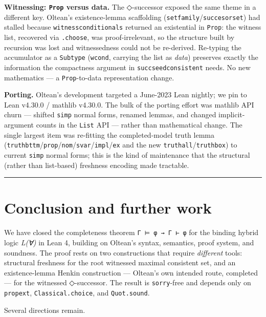 \documentclass[11pt,a4paper]{article}
\renewcommand{\_}{\origtextunderscore\allowbreak}
\begin{document}
\textbf{Witnessing: \texttt{Prop} versus data.} The ◇-successor exposed the same theme in a different key. Oltean's existence-lemma scaffolding (\texttt{set\_family}/\texttt{succesor\_set}) had stalled because \texttt{witness\_conditionals} returned an existential in \texttt{Prop}: the witness list, recovered via \texttt{.choose}, was proof-irrelevant, so the structure built by recursion was lost and witnessedness could not be re-derived. Re-typing the accumulator as a \texttt{Subtype} (\texttt{wcond}, carrying the list as \emph{data}) preserves exactly the information the compactness argument in \texttt{succ\_seed\_consistent} needs. No new mathematics --- a \texttt{Prop}-to-data representation change.

\textbf{Porting.} Oltean's development targeted a June-2023 Lean nightly; we pin to Lean v4.30.0 / mathlib v4.30.0. The bulk of the porting effort was mathlib API churn --- shifted \texttt{simp} normal forms, renamed lemmas, and changed implicit-argument counts in the \texttt{List} API --- rather than mathematical change. The single largest item was re-fitting the completed-model truth lemma (\texttt{truth\_bttm}/\texttt{prop}/\texttt{nom}/\texttt{svar}/\texttt{impl}/\texttt{ex} and the new \texttt{truth\_all}/\texttt{truth\_box}) to current \texttt{simp} normal forms; this is the kind of maintenance that the structural (rather than list-based) freshness encoding made tractable.

\begin{center}\rule{0.5\linewidth}{0.5pt}\end{center}

\hypertarget{conclusion-and-further-work}{%
\section{Conclusion and further work}\label{conclusion-and-further-work}}

We have closed the completeness theorem \texttt{Γ\ ⊨\ φ\ →\ Γ\ ⊢\ φ} for the binding hybrid logic \emph{L(∀)} in Lean 4, building on Oltean's syntax, semantics, proof system, and soundness. The proof rests on two constructions that require \emph{different} tools: structural freshness for the root witnessed maximal consistent set, and an existence-lemma Henkin construction --- Oltean's own intended route, completed --- for the witnessed ◇-successor. The result is \texttt{sorry}-free and depends only on \texttt{propext}, \texttt{Classical.choice}, and \texttt{Quot.sound}.

Several directions remain.
\end{document}
